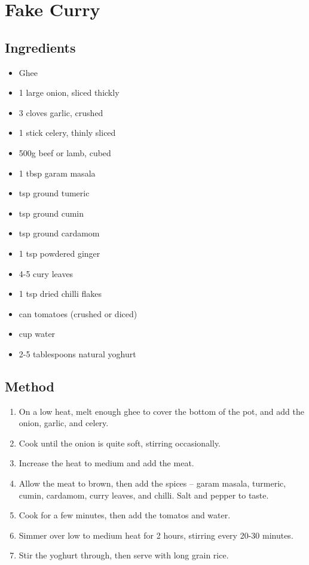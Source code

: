 \section{Fake Curry}


  \begin{multicols}{2}
    \subsection{Ingredients}
      \begin{itemize}
        \item Ghee
        \item 1 large onion, sliced thickly
        \item 3 cloves garlic, crushed
        \item 1 stick celery, thinly sliced
        \item 500g beef or lamb, cubed
        \item 1 tbsp garam masala
        \item {} tsp ground tumeric
        \item {} tsp ground cumin
        \item {} tsp ground cardamom
        \item 1 tsp powdered ginger
        \item 4-5 cury leaves
        \item 1 tsp dried chilli flakes
        \item {} can tomatoes (crushed or diced)
        \item {} cup water
        \item 2-5 tablespoons natural yoghurt
      \end{itemize}
  \vfill\null
  \columnbreak
  \subsection{Method}
    \begin{enumerate}
      \item On a low heat, melt enough ghee to cover the bottom of the pot, and add the onion, garlic, and celery.
      \item Cook until the onion is quite soft, stirring occasionally.
      \item Increase the heat to medium and add the meat.
      \item Allow the meat to brown, then add the spices -- garam masala, turmeric, cumin, cardamom, curry leaves, and chilli. Salt and pepper to taste.
      \item Cook for a few minutes, then add the tomatos and water.
      \item Simmer over low to medium heat for 2 hours, stirring every 20-30 minutes.
      \item Stir the yoghurt through, then serve with long grain rice.
    \end{enumerate}
  \end{multicols}
